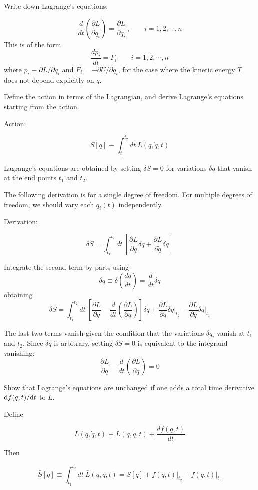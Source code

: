 \documentclass[10pt]{article}
\numberwithin{equation}{section}
\def\be{\begin{equation}}
\def\ee{\end{equation}}
\def\i{\item{}}
\def\d{{\rm{d}}}
\begin{document}
\i Write down Lagrange's equations.

\be
\frac{d}{dt}\left(\frac{\partial L}{\partial \dot q_i}\right)
= \frac{\partial L}{\partial q_i}\,,
\qquad i=1,2,\cdots, n
\ee
%
This is of the form
%
\be
\frac{dp_i}{dt} = F_i
\qquad i=1,2,\cdots, n
\ee
%
where $p_i\equiv \partial L/\partial \dot q_i$ and $F_i = -\partial
U/\partial q_i$, for the case where the kinetic energy 
$T$ does not depend explicitly on $q$.

\i Define the action in terms of the Lagrangian, and derive Lagrange's
equations starting from the action.

Action:

\be
S[q] \equiv \int_{t_1}^{t_2} dt\> L(q,\dot q, t) 
\ee

Lagrange's equations are obtained by setting $\delta S=0$ for
variations $\delta q$ that vanish at the end points $t_1$ and $t_2$.  

The following derivation is for a single degree of freedom.  For
multiple degrees of freedom, we should vary each $q_i(t)$
independently.

Derivation:

\be
\delta S 
= \int_{t_1}^{t_2} dt\> \left[
\frac{\partial L}{\partial q}\delta q +
\frac{\partial L}{\partial \dot q}\delta \dot q\right]
\ee

Integrate the second term by parts using 
\be
\delta \dot q \equiv 
\delta\left(\frac{d q}{d t}\right) 
= \frac{d}{dt}\delta q
\ee
%
obtaining
%
\be
\delta S 
= \int_{t_1}^{t_2} dt\> \left[
\frac{\partial L}{\partial q}
-\frac{d}{dt}\left(\frac{\partial L}{\partial \dot q}\right)\right] \delta q
+ \frac{\partial L}{\partial\dot q}\delta q\bigg|_{t_2}
- \frac{\partial L}{\partial\dot q}\delta q\bigg|_{t_1}
\ee

The last two terms vanish given the condition that the variations
$\delta q_i$ vanish at $t_1$ and $t_2$.  Since $\delta q$ is
arbitrary, setting $\delta S=0$ is equivalent to the integrand
vanishing:
\be
\frac{\partial L}{\partial q}-\frac{d}{dt}\left(\frac{\partial L}{\partial \dot q}\right) = 0
\ee

\i Show that Lagrange's equations are unchanged if one adds a
total time derivative $\d f(q,t)/\d t$ to $L$.

Define

\be
\bar{L}(q,\dot q,t) \equiv L(q,\dot q, t) + \frac{df(q,t)}{dt}
\ee

Then

\be
\bar{S}[q] \equiv \int_{t_1}^{t_2} dt\> \bar{L}(q,\dot q, t) 
= S[q] + f(q,t)\big|_{t_2} - f(q,t)\big|_{t_1}
\ee
\end{document}
